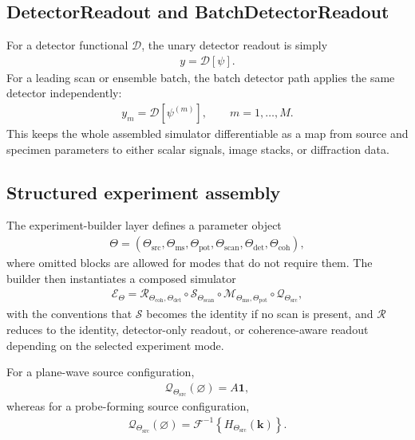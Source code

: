 \documentclass[11pt]{article}
\begin{document}
\subsection{DetectorReadout and BatchDetectorReadout}
For a detector functional $\mathcal{D}$, the unary detector readout is simply
\begin{align}
  y = \mathcal{D}[\psi].
\end{align}
For a leading scan or ensemble batch, the batch detector path applies the same
detector independently:
\begin{align}
  y_m = \mathcal{D}[\psi^{(m)}],
  \qquad m=1,\dots,M.
\end{align}
This keeps the whole assembled simulator differentiable as a map from source and
specimen parameters to either scalar signals, image stacks, or diffraction data.

\subsection{Structured experiment assembly}
The experiment-builder layer defines a parameter object
\begin{align}
  \Theta
  = \left(
    \Theta_{\mathrm{src}},
    \Theta_{\mathrm{ms}},
    \Theta_{\mathrm{pot}},
    \Theta_{\mathrm{scan}},
    \Theta_{\mathrm{det}},
    \Theta_{\mathrm{coh}}
  \right),
\end{align}
where omitted blocks are allowed for modes that do not require them.  The builder then
instantiates a composed simulator
\begin{align}
  \mathcal{E}_{\Theta}
  = \mathcal{R}_{\Theta_{\mathrm{coh}},\Theta_{\mathrm{det}}}
    \circ
    \mathcal{S}_{\Theta_{\mathrm{scan}}}
    \circ
    \mathcal{M}_{\Theta_{\mathrm{ms}},\Theta_{\mathrm{pot}}}
    \circ
    \mathcal{Q}_{\Theta_{\mathrm{src}}},
\end{align}
with the conventions that $\mathcal{S}$ becomes the identity if no scan is present,
and $\mathcal{R}$ reduces to the identity, detector-only readout, or coherence-aware
readout depending on the selected experiment mode.

For a plane-wave source configuration,
\begin{align}
  \mathcal{Q}_{\Theta_{\mathrm{src}}}(\varnothing)
  = A \mathbf{1},
\end{align}
whereas for a probe-forming source configuration,
\begin{align}
  \mathcal{Q}_{\Theta_{\mathrm{src}}}(\varnothing)
  = \mathcal{F}^{-1}\left\{
    H_{\Theta_{\mathrm{src}}}(\mathbf{k})
  \right\}.
\end{align}
\end{document}
